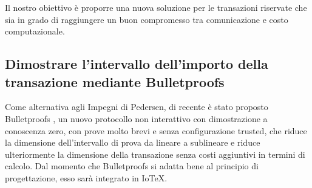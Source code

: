 Il nostro obiettivo è proporre una nuova soluzione per le transazioni riservate che sia in grado di raggiungere un buon compromesso tra comunicazione e costo computazionale.

\subsection{Dimostrare l'intervallo dell'importo della transazione mediante Bulletproofs}
Come alternativa agli Impegni di Pedersen, di recente è stato proposto Bulletproofs \cite{c5}, un nuovo protocollo non interattivo con dimostrazione a conoscenza zero, con prove molto brevi e senza configurazione trusted, che riduce la dimensione dell'intervallo di prova da lineare a sublineare e riduce ulteriormente la dimensione della transazione senza costi aggiuntivi in termini di calcolo. Dal momento che  Bulletproofs si adatta bene al principio di progettazione, esso sarà integrato in IoTeX.